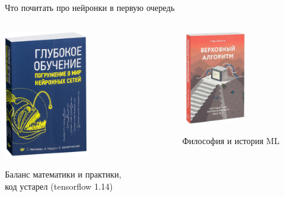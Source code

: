 \documentclass[notes,12pt, aspectratio=169]{beamer}
\begin{document}
\begin{frame}{Что почитать про нейронки в первую очередь}
\begin{columns}
	\begin{column}{0.5\textwidth}
\begin{center}
	\includegraphics[width=0.5\textwidth]{book1.jpg}  
	
	\footnotesize Баланс математики и практики, \\ код устарел (tensorflow 1.14)
\end{center}

	\end{column}
	\begin{column}{0.5\textwidth}
		\begin{center}
			\includegraphics[width=0.5\textwidth]{book2.jpg} 
			
			\footnotesize Философия и история ML
		\end{center}
	\end{column}
\end{columns}
\end{frame} 
\end{document}
